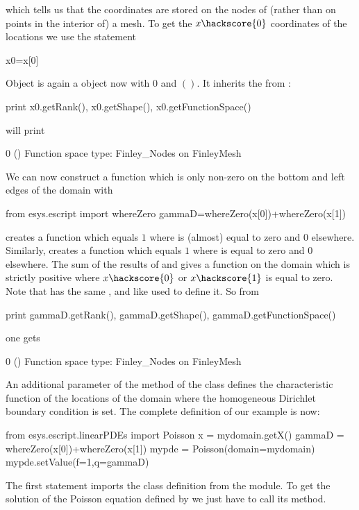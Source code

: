 which tells us that the coordinates are stored on the nodes of (rather than on
points in the interior of) a \finley mesh.
To get the  $x\hackscore{0}$ coordinates of the locations we use the statement 
\begin{python}
  x0=x[0]
\end{python}
Object  is again a \Data object now with \Rank $0$ and \Shape $()$.
It inherits the \FunctionSpace from :
\begin{python}
  print x0.getRank(), x0.getShape(), x0.getFunctionSpace()
\end{python}
will print
\begin{python}
  0 () Function space type: Finley_Nodes on FinleyMesh 
\end{python}
We can now construct a function  which is only non-zero on the
bottom and left edges of the domain with
\begin{python}
  from esys.escript import whereZero
  gammaD=whereZero(x[0])+whereZero(x[1])
\end{python}

 creates a function which equals $1$ where  is (almost) equal to zero and $0$ elsewhere. 
Similarly,  creates a function which equals $1$ where  is equal to zero and $0$ elsewhere.
The sum of the results of  and 
gives a function on the domain  which is strictly positive where $x\hackscore{0}$ or $x\hackscore{1}$ is equal to zero.
Note that  has the same \Rank, \Shape and \FunctionSpace like  used to define it.
So from 
\begin{python}
  print gammaD.getRank(), gammaD.getShape(), gammaD.getFunctionSpace()
\end{python}
one gets 
\begin{python}
  0 () Function space type: Finley_Nodes on FinleyMesh 
\end{python}
An additional parameter  of the  method of the \Poisson
class defines the characteristic function of
the locations of the domain where the homogeneous Dirichlet boundary condition is set.
The complete definition of our example is now:
\begin{python}
  from esys.escript.linearPDEs import Poisson
  x = mydomain.getX()
  gammaD = whereZero(x[0])+whereZero(x[1])
  mypde = Poisson(domain=mydomain)
  mypde.setValue(f=1,q=gammaD)
\end{python}
The first statement imports the \Poisson class definition from the \linearPDEs module.
To get the solution of the Poisson equation defined by  we just have to call its  method. 

